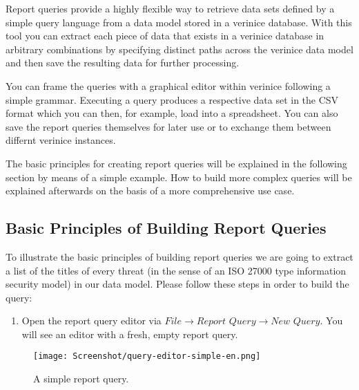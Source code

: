 \documentclass[a4paper,10pt]{book}
\providecommand{\tightlist}{%
  \setlength{\itemsep}{0pt}\setlength{\parskip}{0pt}}
\begin{document}
Report queries provide a highly flexible way to retrieve data sets defined by a
simple query language from a data model stored in a verinice database. With this
tool you can extract each piece of data that exists in a verinice database in
arbitrary combinations by specifying distinct paths across the verinice data
model and then save the resulting data for further processing.

You can frame the queries with a graphical editor within verinice following a
simple grammar. Executing a query produces a respective data set in the CSV
format which you can then, for example, load into a spreadsheet. You can also
save the report queries themselves for later use or to exchange them between
differnt verinice instances.

The basic principles for creating report queries will be explained in the
following section by means of a simple example. How to build more complex
queries will be explained afterwards on the basis of a more comprehensive use
case.

\subsection{Basic Principles of Building Report
Queries}\label{basic-principles-of-building-report-queries}

To illustrate the basic principles of building report queries we are going to
extract a list of the titles of every threat (in the sense of an ISO 27000 type
information security model) in our data model. Please follow these steps in
order to build the query:

\begin{enumerate}
\def\labelenumi{\arabic{enumi}.}
\tightlist
\item
  Open the report query editor via $\textit{File}\to\textit{Report
  Query}\to\textit{New Query}$. You will see an editor with a fresh, empty
  report query.
\end{enumerate}

\begin{figure}[htb!]
  \centering
  \texttt{[image: Screenshot/query-editor-simple-en.png]}
  \caption{A simple report query.}
  \label{fig:simple-report-query}
\end{figure}
\end{document}
